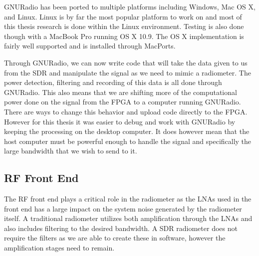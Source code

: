 GNURadio has been ported to multiple platforms including Windows, Mac OS X, and Linux.  Linux is by far the most popular platform to work on and most of this thesis research is done within the Linux environment.  Testing is also done though with a MacBook Pro running OS X 10.9.  The OS X implementation is fairly well supported and is installed through MacPorts.  

Through GNURadio, we can now write code that will take the data given to us from the SDR and manipulate the signal as we need to mimic a radiometer.  The power detection, filtering and recording of this data is all done through GNURadio.  This also means that we are shifting more of the computational power done on the signal from the FPGA to a computer running GNURadio.  There are ways to change this behavior and upload code directly to the FPGA.  However for this thesis it was easier to debug and work with GNURadio by keeping the processing on the desktop computer.  It does however mean that the host computer must be powerful enough to handle the signal and specifically the large bandwidth that we wish to send to it.  

\subsection{RF Front End}
The RF front end plays a critical role in the radiometer as the LNAs used in the front end has a large impact on the system noise generated by the radiometer itself.  A traditional radiometer utilizes both amplification through the LNAs and also includes filtering to the desired bandwidth.  A SDR radiometer does not require the filters as we are able to create these in software, however the amplification stages need to remain.  

